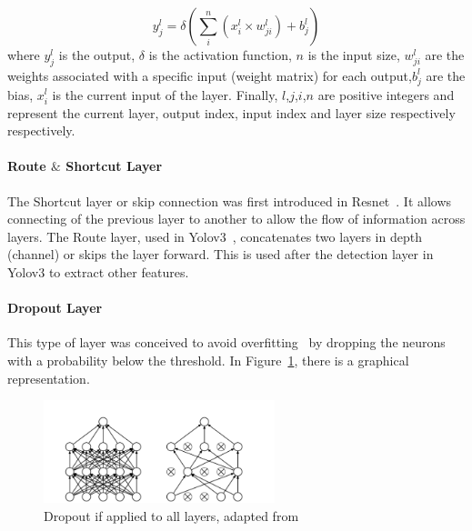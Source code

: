 \begin{equation} \label{equation:connected}
     \displaystyle y_{j}^{l}=\delta (\sum_{i}^{n}(x_{i}^{l} \times w_{ji}^{l})+ b_{j}^{l})
\end{equation}
where $ y_{j}^{l}$ is the output, $\delta$ is the activation function, $n$ is the input size, $ w_{ji}^{l} $  are the weights associated with a specific input (weight matrix) for each output,$ b_{j}^{l}$ are the bias, $x_{i}^{l}$ is the current
input of the layer. Finally, $l$,$j$,$i$,$n$ are positive integers and represent the current layer, output index, input index and layer size respectively respectively.


\paragraph{Route $\&$ Shortcut Layer}

The Shortcut layer or skip connection was first introduced in
Resnet~\cite{resnet}.  It allows connecting of the previous layer to another to
allow the flow of information across layers.  The Route layer, used in
Yolov3~\cite{yolov3}, concatenates two layers in depth (channel) or skips the
layer forward. This is used after the detection layer in Yolov3 to extract other
features.

\paragraph{Dropout Layer}

This type of layer was conceived to avoid overfitting~\cite{Dropout} by dropping
the neurons with a probability below the threshold. In Figure~\ref{figure:Dropout}, there is a graphical representation.
\begin{figure}[!htbp]
    \centering
    \includegraphics[width=0.6\textwidth]{Figures/dropout.png}
    \caption{Dropout if applied to all layers, adapted from~\cite{Dropout}}
    \label{figure:Dropout}
\end{figure} 

